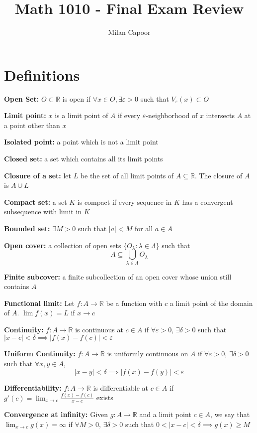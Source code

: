 \documentclass[12pt]{article}
\title{Math 1010 - Final Exam Review}
\author{Milan Capoor}
\date{}
\newcommand{\R}{\mathbb{R}}
\newcommand{\abs}[1]{\left\vert #1 \right\vert}
\newcommand{\ep}{\varepsilon}
\begin{document}
\maketitle

\section{Definitions}
    \textbf{Open Set:} $O \subset \R$ is open if $\forall x \in O, \exists \ep > 0$ such that $V_{\ep}(x) \subset O$ 

    \textbf{Limit point:} $x$ is a limit point of $A$ if every $\ep$-neighborhood of $x$ intersects $A$ at a point other than $x$

    \textbf{Isolated point:} a point which is not a limit point

    \textbf{Closed set:} a set which contains all its limit points

    \textbf{Closure of a set:} let $L$ be the set of all limit points of $A \subseteq \R$. The closure of $A$ is $A \cup L$ 

    \textbf{Compact set:} a set $K$ is compact if every sequence in $K$ has a convergent subsequence with limit in $K$

    \textbf{Bounded set:} $\exists M > 0$ such that $\abs{a} < M$ for all $a \in A$

    \textbf{Open cover:} a collection of open sets $\{O_{\lambda}: \lambda \in \Lambda\}$ such that 
    \[A \subseteq \bigcup_{\lambda \in \Lambda} O_{\lambda}\]

    \textbf{Finite subcover:} a finite subcollection of an open cover whose union still contains $A$

    \textbf{Functional limit:} Let $f: A \to \R$ be a function with $c$ a limit point of the domain of $A$. $\lim f(x) = L$ if $x \to c$ 

    \textbf{Continuity:} $f: A \to \R$ is continuous at $c \in A$ if $\forall \ep > 0$, $\exists \delta > 0$ such that $\abs{x - c} < \delta \implies \abs{f(x) - f(c)} < \ep$

    \textbf{Uniform Continuity:} $f: A \to \R$ is uniformly continuous on $A$ if $\forall \ep > 0$, $\exists \delta > 0$ such that $\forall x, y \in A$, 
    \[\abs{x - y} < \delta \implies \abs{f(x) - f(y)} < \ep\]

    \textbf{Differentiability:} $f: A \to \R$ is differentiable at $c \in A$ if $g'(c) = \lim_{x \to c} \frac{f(x) - f(c)}{x - c}$ exists

    \textbf{Convergence at infinity:} Given $g: A \to \R$ and a limit point $c \in A$, we say that $\lim_{x \to c} g(x) = \infty$ if $\forall M > 0$, $\exists \delta > 0$ such that $0 < \abs{x - c} < \delta \implies g(x) \geq M$
\end{document}
